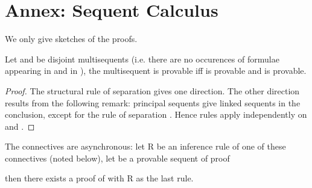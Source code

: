 \documentclass{llncs}
\begin{document}





\newpage
\section{Annex: Sequent Calculus}





We only give sketches of the proofs.

\begin{lemma}[Separability]
Let  and  be disjoint multisequents (i.e. there are no occurences of formulae appearing in  and 
in ), the multisequent  is provable iff  is provable and  is provable. 
\end{lemma}

\begin{proof}
The structural rule of separation  gives one direction. The other direction results from the following remark: principal sequents give linked sequents in the conclusion, except for the rule of separation . Hence rules apply independently on  and .
\end{proof}





\begin{lemma}[Asynchrony]
The connectives  are asynchronous: let R be an 
inference rule of one of these connectives (noted  below), let 
 be a provable sequent of proof

then there exists a proof of  with R as the last rule.
\end{lemma}
\end{document}
